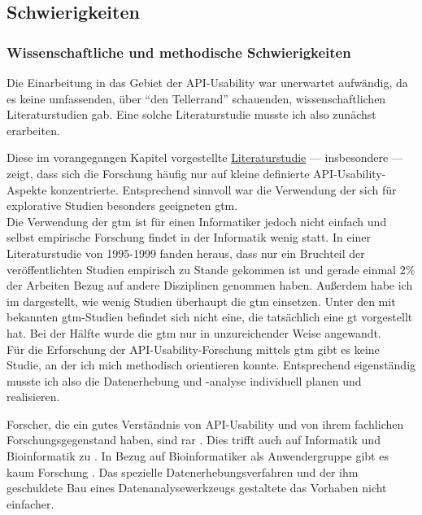 \subsection{Schwierigkeiten}
\label{sec:schwierigkeiten}

\subsubsection{Wissenschaftliche und methodische Schwierigkeiten}

Die Einarbeitung in das Gebiet der API-Usability war unerwartet aufwändig, da es keine umfassenden, über ``den Tellerrand'' schauenden, wissenschaftlichen Literaturstudien gab. Eine solche Literaturstudie musste ich also zunächst erarbeiten.

Diese im vorangegangen Kapitel vorgestellte \href{sec:forschungsstand}{Literaturstudie} --- insbesondere \cite{Robillard:2010bh,Eisenberg:2010bm,Stylos:2009bq,Stylos:2008jt,Ellis:2007kv} --- zeigt, dass sich die Forschung häufig nur auf kleine definierte API-Usability-Aspekte konzentrierte. Entsprechend sinnvoll war die Verwendung der sich für explorative Studien besonders geeigneten \gls{gtm}.
\\Die Verwendung der \gls{gtm} ist für einen Informatiker jedoch nicht einfach und selbst empirische Forschung findet in der Informatik wenig statt. In einer Literaturstudie von 1995-1999 fanden \cite{Glass:2002ec} heraus, dass nur ein Bruchteil der veröffentlichten Studien empirisch zu Stande gekommen ist und gerade einmal 2\% der Arbeiten Bezug auf andere Disziplinen genommen haben. Außerdem habe ich im  dargestellt, wie wenig Studien überhaupt die \gls{gtm} einsetzen. Unter den mit bekannten \gls{gtm}-Studien befindet sich nicht eine, die tatsächlich eine \gls{gt} vorgestellt hat. Bei der Hälfte wurde die \gls{gtm} nur in unzureichender Weise angewandt.
\\Für die Erforschung der API-Usability-Forschung mittels \gls{gtm} gibt es keine Studie, an der ich mich methodisch orientieren konnte. Entsprechend eigenständig musste ich also die Datenerhebung und -analyse individuell planen und realisieren.

Forscher, die ein gutes Verständnis von API-Usability und von ihrem fachlichen Forschungsgegenstand haben, sind rar \citep{DaqingHou:2005ba}. Dies trifft auch auf Informatik und Bioinformatik zu \citep{Tisdall:2001td}. In Bezug auf Bioinformatiker als Anwendergruppe gibt es kaum Forschung \citep{Letondal:2006dy}. Das spezielle Datenerhebungsverfahren und der ihm geschuldete Bau eines Datenanalysewerkzeugs gestaltete das Vorhaben nicht einfacher.

